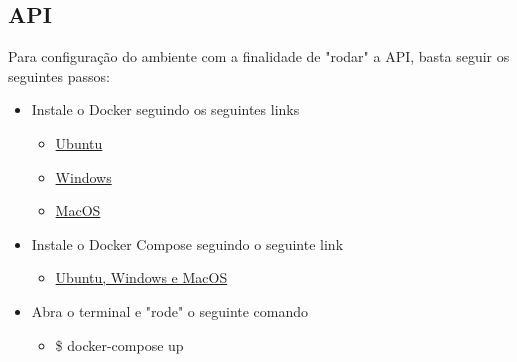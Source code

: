 \begin{apendicesenv}
\subsection{API}
Para configuração do ambiente com a finalidade de "rodar" a API, basta seguir os seguintes passos:
\begin{itemize}
    \item{Instale o Docker seguindo os seguintes links}
        \begin{itemize}
            \item{}\href{https://docs.docker.com/install/linux/docker-ce/ubuntu/}{Ubuntu}
            \item{} \href{https://docs.docker.com/docker-for-windows/install/}{Windows}
            \item{} \href{https://docs.docker.com/docker-for-mac/install/}{MacOS}
        \end{itemize}
    \item{Instale o Docker Compose seguindo o seguinte link}
        \begin{itemize}
            \item{}\href{https://docs.docker.com/compose/install/#install-compose}{Ubuntu, Windows e MacOS}
        \end{itemize}
    \item{Abra o terminal e "rode" o seguinte comando}
        \begin{itemize}
            \item{} \$ docker-compose up
        \end{itemize}
\end{itemize}

\end{apendicesenv}
